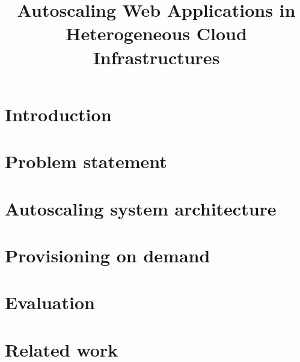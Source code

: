 \documentclass[conference]{IEEEtran}
\begin{document}
\title{Autoscaling Web Applications in Heterogeneous Cloud Infrastructures}

\author{
\and
{}
\and
{}
}

\maketitle

\begin{abstract}

\end{abstract}


\section{Introduction}

\label{sec:introduction}

\section{Problem statement}

\label{sec:motivation}

\section{Autoscaling system architecture}
\label{sec:proposed_approach}


\section{Provisioning on demand}
\label{sec:decisionMaking}


\section{Evaluation}
\label{sec:evaluation}


\section{Related work}
\label{sec:relatedWorks}

\end{document}
